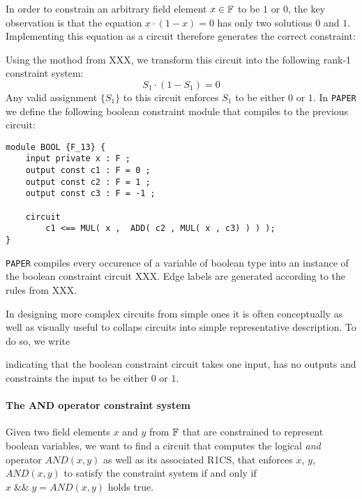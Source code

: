 In order to constrain an arbitrary field element $x\in \mathbb{F}$ to be $1$ or $0$, the key observation is that the equation $x \cdot (1-x) =0$ has only two solutions $0$ and $1$. Implementing this equation as a circuit therefore generates the correct constraint:
\begin{center}
\end{center}
Using the mothod from XXX, we transform this circuit into the following rank-1 constraint system:
$$
S_1 \cdot (1-S_1) = 0
$$
Any valid assignment $\{S_1\}$ to this circuit enforces $S_1$ to be either $0$ or $1$. In \texttt{PAPER} we define the following boolean constraint module that compiles to the previous circuit:
\begin{lstlisting}
module BOOL {F_13} {
	input private x : F ; 
	output const c1 : F = 0 ;
	output const c2 : F = 1 ;
	output const c3 : F = -1 ;

	circuit
		c1 <== MUL( x ,  ADD( c2 , MUL( x , c3) ) ) );
}
\end{lstlisting}
\texttt{PAPER} compiles every occurence of a variable of boolean type into an instance of the boolean constraint circuit XXX. Edge labels are generated according to the rules from XXX.

In designing more complex circuits from simple ones it is often conceptually as well as visually useful to collaps circuits into simple representative description. To do so, we write 
\begin{center}
\end{center}
indicating that the boolean constraint circuit takes one input, has no outputs and constraints the input to be either $0$ or $1$.
\paragraph{The AND operator constraint system} Given two field elements $x$ and $y$ from $\mathbb{F}$ that are constrained to represent boolean variables, we want to find a circuit that computes the logical \textit{and} operator $AND(x,y)$ as well as its associated R1CS, that enforces $x$, $y$, $AND(x,y)$ to satisfy the constraint system if and only if $x\; \&\& \; y =AND(x,y)$ holds true. 

